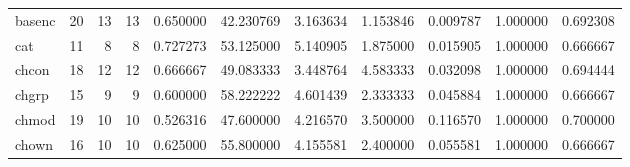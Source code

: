 \begin{tabular}{lrrrrrrrrrr}
basenc    &                                      20 &                 13 &                                13 &                                   0.650000 &                              42.230769 &                                     3.163634 &                          1.153846 &                                0.009787 &                           1.000000 &                                           0.692308 \\
cat       &                                      11 &                  8 &                                 8 &                                   0.727273 &                              53.125000 &                                     5.140905 &                          1.875000 &                                0.015905 &                           1.000000 &                                           0.666667 \\
chcon     &                                      18 &                 12 &                                12 &                                   0.666667 &                              49.083333 &                                     3.448764 &                          4.583333 &                                0.032098 &                           1.000000 &                                           0.694444 \\
chgrp     &                                      15 &                  9 &                                 9 &                                   0.600000 &                              58.222222 &                                     4.601439 &                          2.333333 &                                0.045884 &                           1.000000 &                                           0.666667 \\
chmod     &                                      19 &                 10 &                                10 &                                   0.526316 &                              47.600000 &                                     4.216570 &                          3.500000 &                                0.116570 &                           1.000000 &                                           0.700000 \\
chown     &                                      16 &                 10 &                                10 &                                   0.625000 &                              55.800000 &                                     4.155581 &                          2.400000 &                                0.055581 &                           1.000000 &                                           0.666667 \\

\end{tabular}
